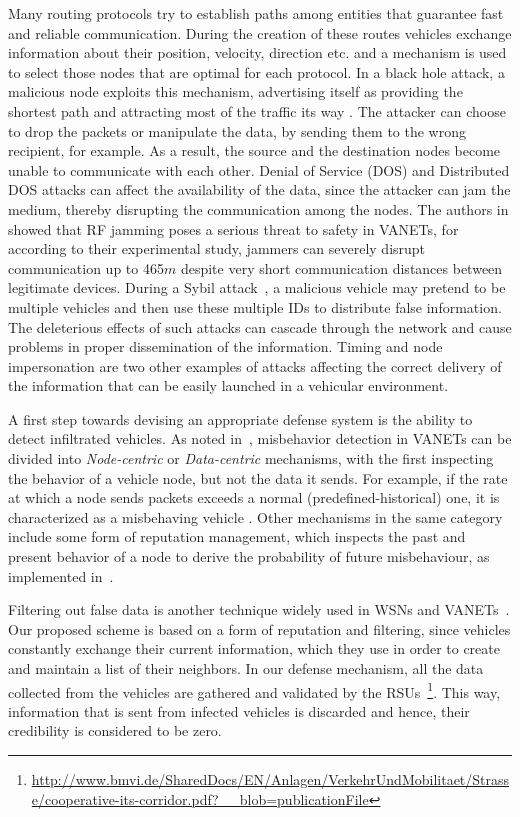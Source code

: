 \documentclass[conference]{IEEEtran}
\begin{document}
Many routing protocols try to establish paths among entities that guarantee fast and reliable communication. During the creation of these routes vehicles exchange information about their position, velocity, direction etc. and a mechanism is used to select those nodes that are optimal for each protocol. In a black hole attack, a malicious node exploits this mechanism, advertising itself as providing the shortest path and attracting most of the traffic its way \cite{bibhu2012performance}.  The attacker can choose to drop the packets or manipulate the data, by sending them to the wrong recipient, for example. As a result, the source and the destination nodes
become unable to communicate with each other. Denial of Service (DOS) and Distributed DOS attacks can affect the availability of the data, since the attacker can jam the medium, thereby disrupting the communication among the nodes. The authors in \cite{Punal_2015} showed that RF jamming poses a serious threat to safety in VANETs, for according to their experimental study, jammers can severely disrupt communication up to 465$m$ despite very short communication distances between legitimate devices. 
During a Sybil attack~\cite{sumra2011classes}, a malicious vehicle may pretend to be multiple vehicles  and then use these multiple IDs to distribute
false information. The deleterious effects of such attacks can cascade through the network and cause problems in proper dissemination
of the information. Timing and node impersonation are two other examples of attacks affecting the correct delivery of the information that can be easily launched in a vehicular environment.




A first step towards devising an appropriate defense system is the ability to detect infiltrated vehicles. As noted in~\cite{khan2015detailed}, misbehavior detection in VANETs can be divided into {\it Node-centric} or {\it  Data-centric} mechanisms, with the first inspecting the behavior of a vehicle node, but not the data it sends. For example, 
if the rate at which a node sends packets exceeds a normal (predefined-historical) one, it is characterized as a misbehaving vehicle \cite{maglaras2015}. Other mechanisms in the same category include 
some form of reputation management, which inspects the past and present behavior of a node to derive the probability of future misbehaviour, as implemented in~\cite{kim2012misbehavior}. 

Filtering out false data is another technique widely used in WSNs and VANETs~\cite{cao2008proof}. 
Our proposed scheme is based on a form of reputation and filtering, since vehicles constantly exchange their current information, 
which they use in order to create and maintain a list of their neighbors. In our defense mechanism, all the data collected from the vehicles are gathered and validated by the RSUs~\footnote{\url{http://www.bmvi.de/SharedDocs/EN/Anlagen/VerkehrUndMobilitaet/Strasse/cooperative-its-corridor.pdf?__blob=publicationFile}}.
This way, information that is sent from infected vehicles is discarded and hence, their credibility is considered to be zero.
\end{document}
